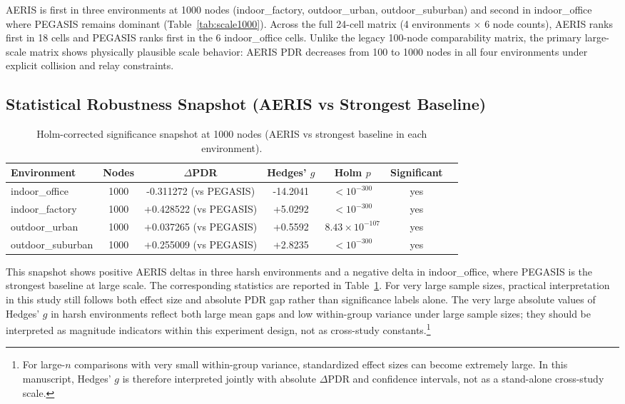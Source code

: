 ﻿\documentclass[sensors,article,submit,moreauthors,pdftex]{Definitions/mdpi}
\begin{document}
AERIS is first in three environments at 1000 nodes (indoor\_factory, outdoor\_urban, outdoor\_suburban) and second in indoor\_office where PEGASIS remains dominant (Table~\ref{tab:scale1000}).
Across the full 24-cell matrix (4 environments $\times$ 6 node counts), AERIS ranks first in 18 cells and PEGASIS ranks first in the 6 indoor\_office cells.
Unlike the legacy 100-node comparability matrix, the primary large-scale matrix shows physically plausible scale behavior: AERIS PDR decreases from 100 to 1000 nodes in all four environments under explicit collision and relay constraints.

\subsection{Statistical Robustness Snapshot (AERIS vs Strongest Baseline)}
\begin{table}[H]
\caption{Holm-corrected significance snapshot at 1000 nodes (AERIS vs strongest baseline in each environment).}
\label{tab:robust_snapshot}
\centering
\begin{tabular}{lcccccc}
\toprule
Environment & Nodes & $\Delta$PDR & Hedges' $g$ & Holm $p$ & Significant \\
\midrule
indoor\_office    & 1000 & -0.311272 (vs PEGASIS) & -14.2041 & $<10^{-300}$ & yes \\
indoor\_factory   & 1000 & +0.428522 (vs PEGASIS) & +5.0292 & $<10^{-300}$ & yes \\
outdoor\_urban    & 1000 & +0.037265 (vs PEGASIS) & +0.5592 & $8.43\times10^{-107}$ & yes \\
outdoor\_suburban & 1000 & +0.255009 (vs PEGASIS) & +2.8235 & $<10^{-300}$ & yes \\
\bottomrule
\end{tabular}
\end{table}

This snapshot shows positive AERIS deltas in three harsh environments and a negative delta in indoor\_office, where PEGASIS is the strongest baseline at large scale.
The corresponding statistics are reported in Table~\ref{tab:robust_snapshot}.
For very large sample sizes, practical interpretation in this study still follows both effect size and absolute PDR gap rather than significance labels alone.
The very large absolute values of Hedges' $g$ in harsh environments reflect both large mean gaps and low within-group variance under large sample sizes; they should be interpreted as magnitude indicators within this experiment design, not as cross-study constants.\footnote{For large-\(n\) comparisons with very small within-group variance, standardized effect sizes can become extremely large. In this manuscript, Hedges' \(g\) is therefore interpreted jointly with absolute \(\Delta\)PDR and confidence intervals, not as a stand-alone cross-study scale.}
\end{document}
